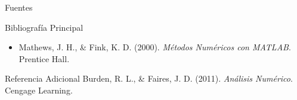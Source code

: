 \documentclass[aspectratio=169, t]{beamer}
\begin{document}
\begin{frame}{Fuentes}
    \begin{concept}{Bibliografía Principal}
        \begin{itemize}
            \item Mathews, J. H., \& Fink, K. D. (2000). \textit{Métodos Numéricos con MATLAB}. Prentice Hall.
        \end{itemize}
    \end{concept}
    \vspace{0.5cm}
    \begin{mathstep}{Referencia Adicional}
        Burden, R. L., \& Faires, J. D. (2011). \textit{Análisis Numérico}. Cengage Learning.
    \end{mathstep}
\end{frame}
\end{document}
